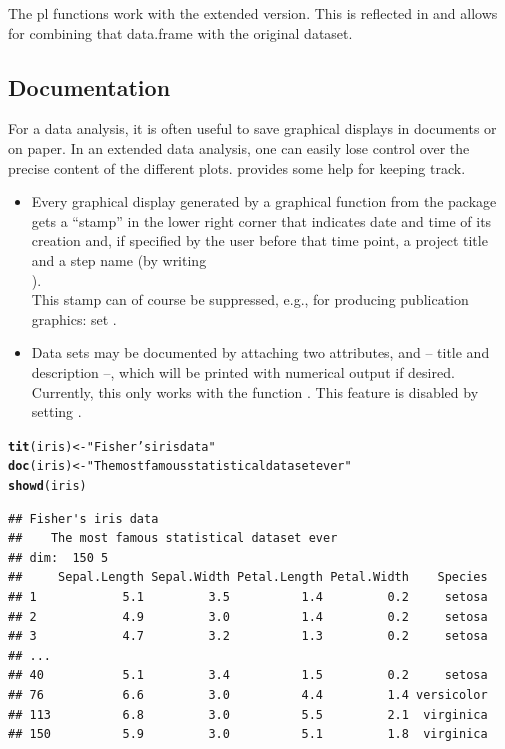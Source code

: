 \documentclass[11pt]{article}\usepackage[]{graphicx}\usepackage[]{color}
\makeatletter
\newcommand{\hlstr}[1]{\textcolor[rgb]{0.192,0.494,0.8}{#1}}%
\newcommand{\hlstd}[1]{\textcolor[rgb]{0.345,0.345,0.345}{#1}}%
\newcommand{\hlkwb}[1]{\textcolor[rgb]{0.69,0.353,0.396}{#1}}%
\newcommand{\hlkwd}[1]{\textcolor[rgb]{0.737,0.353,0.396}{\textbf{#1}}}%
\newenvironment{kframe}{%
 \def\at@end@of@kframe{}%
 \ifinner\ifhmode%
  \def\at@end@of@kframe{\end{minipage}}%
  \begin{minipage}{\columnwidth}%
 \fi\fi%
 \def\FrameCommand##1{\hskip\@totalleftmargin \hskip-\fboxsep
 \colorbox{shadecolor}{##1}\hskip-\fboxsep
     \hskip-\linewidth \hskip-\@totalleftmargin \hskip\columnwidth}%
 \MakeFramed {\advance\hsize-\width
   \@totalleftmargin\z@ \linewidth\hsize
   \@setminipage}}%
 {\par\unskip\endMakeFramed%
 \at@end@of@kframe}
\newenvironment{knitrout}{}{} %
\makeatother
\begin{document}
The pl functions  work with the extended
version. This is reflected in  and allows for
combining that data.frame with the original dataset.

\subsection{Documentation}
For a data analysis, it is often useful to save graphical displays in 
documents or on paper. In an extended data analysis, one can easily lose
control over the precise content of the different plots.
 provides some help for keeping track.
\begin{itemize}
\item 
  Every graphical display generated by a graphical function from the
  package gets a ``stamp'' in the lower right corner that indicates date
  and time of its creation and, if specified by the user before that 
  time point, a project title and a step name (by writing\\
  ).\\
  This stamp can of course be suppressed, e.g., for producing publication
  graphics: set \Hneed{40mm} .
\item
  Data sets may be documented by attaching two attributes,  and 
   -- title and description --, which will be printed with
  numerical output if desired.
  Currently, this only works with the function .
  This feature is disabled by setting .
\end{itemize}
\begin{knitrout}
\color{fgcolor}\begin{kframe}
\begin{alltt}
  \hlkwd{tit}\hlstd{(iris)} \hlkwb{<-} \hlstr{"Fisher's iris data"}
  \hlkwd{doc}\hlstd{(iris)} \hlkwb{<-} \hlstr{"The most famous statistical dataset ever"}
  \hlkwd{showd}\hlstd{(iris)}
\end{alltt}
\begin{verbatim}
## Fisher's iris data 
##    The most famous statistical dataset ever
## dim:  150 5 
##     Sepal.Length Sepal.Width Petal.Length Petal.Width    Species
## 1            5.1         3.5          1.4         0.2     setosa
## 2            4.9         3.0          1.4         0.2     setosa
## 3            4.7         3.2          1.3         0.2     setosa
## ...                                                             
## 40           5.1         3.4          1.5         0.2     setosa
## 76           6.6         3.0          4.4         1.4 versicolor
## 113          6.8         3.0          5.5         2.1  virginica
## 150          5.9         3.0          5.1         1.8  virginica
\end{verbatim}
\end{kframe}
\end{knitrout}
\end{document}
